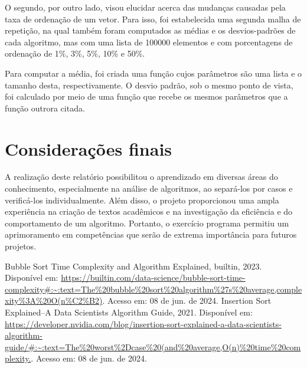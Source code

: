 \documentclass[10pt,a4paper]{article}
\begin{document}
    O segundo, por outro lado, visou elucidar acerca das mudanças causadas pela taxa de ordenação de um vetor.
    Para isso, foi estabelecida uma segunda malha de repetição, na qual também foram computados as médias e os desvios-padrões de cada algoritmo, mas com uma lista de 100000 elementos e com porcentagens de ordenação de 1\%, 3\%, 5\%, 10\% e 50\%.
    

    Para computar a média, foi criada uma função cujos parâmetros são uma lista e o tamanho desta, respectivamente. O desvio padrão, sob o mesmo ponto de vista, foi calculado por meio de uma função que recebe os mesmos parâmetros que a função outrora citada.
    


\newpage
\tableofcontents










\section{Considerações finais}
A realização deste relatório possibilitou o aprendizado em diversas áreas do conhecimento, especialmente na análise de algoritmos, ao separá-los por casos e verificá-los individualmente.
Além disso, o projeto proporcionou uma ampla experiência na criação de textos acadêmicos e na investigação da eficiência e do comportamento de um algoritmo.
Portanto, o exercício programa permitiu um aprimoramento em competências que serão de extrema importância para futuros projetos.

\newpage
\begin{thebibliography}{3}
    Bubble Sort Time Complexity and Algorithm Explained, builtin, 2023. Disponível em: \url{https://builtin.com/data-science/bubble-sort-time-complexity#:~:text=The%20bubble%20sort%20algorithm%27s%20average,complexity%3A%20O(n%C2%B2)}. Acesso em: 08 de jun. de 2024.
    Insertion Sort Explained–A Data Scientists Algorithm Guide, 2021. Disponível em: \url{https://developer.nvidia.com/blog/insertion-sort-explained-a-data-scientists-algorithm-guide/#:~:text=The%20worst%2Dcase%20(and%20average,O(n)%20time%20complexity.}. Acesso em: 08 de jun. de 2024.
\end{thebibliography}
\end{document}
